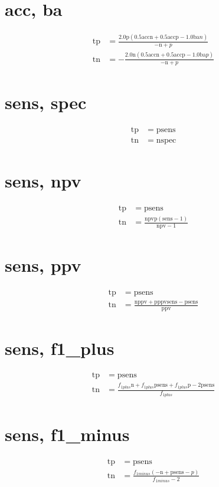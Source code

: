 \documentclass[3p,times]{elsarticle}
\begin{document}
\begin{footnotesize}
\begin{landscape}
\section{acc, ba}
\begin{align}
\mathrm{tp} &= \frac{2.0 \mathrm{p} \left(0.5 \mathrm{acc} \mathrm{n} + 0.5 \mathrm{acc} \mathrm{p} - 1.0 \mathrm{ba} n\right)}{- \mathrm{n} + p}\\
\mathrm{tn} &= - \frac{2.0 \mathrm{n} \left(0.5 \mathrm{acc} \mathrm{n} + 0.5 \mathrm{acc} \mathrm{p} - 1.0 \mathrm{ba} p\right)}{- \mathrm{n} + p}
\end{align}
\section{sens, spec}
\begin{align}
\mathrm{tp} &= \mathrm{p} \mathrm{sens}\\
\mathrm{tn} &= \mathrm{n} \mathrm{spec}
\end{align}
\section{sens, npv}
\begin{align}
\mathrm{tp} &= \mathrm{p} \mathrm{sens}\\
\mathrm{tn} &= \frac{\mathrm{npv} \mathrm{p} \left(\mathrm{sens} - 1\right)}{\mathrm{npv} - 1}
\end{align}
\section{sens, ppv}
\begin{align}
\mathrm{tp} &= \mathrm{p} \mathrm{sens}\\
\mathrm{tn} &= \frac{\mathrm{n} \mathrm{ppv} + \mathrm{p} \mathrm{ppv} \mathrm{sens} - \mathrm{p} \mathrm{sens}}{\mathrm{ppv}}
\end{align}
\section{sens, f1_plus}
\begin{align}
\mathrm{tp} &= \mathrm{p} \mathrm{sens}\\
\mathrm{tn} &= \frac{f_{1 plus} \mathrm{n} + f_{1 plus} \mathrm{p} \mathrm{sens} + f_{1 plus} \mathrm{p} - 2 \mathrm{p} \mathrm{sens}}{f_{1 plus}}
\end{align}
\section{sens, f1_minus}
\begin{align}
\mathrm{tp} &= \mathrm{p} \mathrm{sens}\\
\mathrm{tn} &= \frac{f_{1 minus} \left(- \mathrm{n} + \mathrm{p} \mathrm{sens} - p\right)}{f_{1 minus} - 2}
\end{align}

\end{landscape}
\end{footnotesize}
\end{document}
